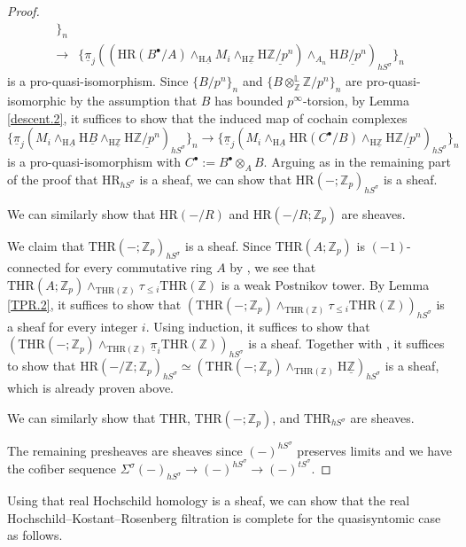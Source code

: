 \documentclass[10pt]{amsart}
\theoremstyle{definition}
\numberwithin{equation}{section}
\renewcommand{\L}{\mathbb{L}}
\newcommand{\Z}{\mathbb{Z}}
\newcommand{\rH}{\mathrm{H}}
\newcommand{\ul}{\underline}
\newcommand{\HR}{\mathrm{HR}}
\newcommand{\THR}{\mathrm{THR}}
\begin{document}
{\begin{proof}
\begin{align*}
\}_n
\\
\to &
\{
\ul{\pi}_j ((\HR(B^\bullet/A)\wedge_{\rH \ul{A}} M_i\wedge_{\rH \ul{\Z}}\rH \ul{\Z/p^n})\wedge_{A_n} \rH \ul{B/p^n})_{hS^\sigma}
\}_n
\end{align*}
is a pro-quasi-isomorphism.
Since $\{B/p^n\}_n$ and $\{B\otimes_{\Z}^\L\Z/p^n\}_n$ are pro-quasi-isomorphic by the assumption that $B$ has bounded $p^\infty$-torsion,
by Lemma \ref{descent.2},
it suffices to show that the induced map of cochain complexes
\[
\{
\ul{\pi}_j (M_i\wedge_{\rH \ul{A}}\rH \ul{B}\wedge_{\rH \ul{\Z}}\rH \ul{\Z/p^n})_{hS^\sigma}
\}_n
\to 
\{
\ul{\pi}_j (M_i\wedge_{\rH \ul{A}} \HR(C^\bullet/B)\wedge_{\rH \ul{\Z}}\rH \ul{\Z/p^n})_{hS^\sigma}
\}_n
\]
is a pro-quasi-isomorphism  with $C^\bullet:=B^\bullet\otimes_{A}B$.
Arguing as in the remaining part of the proof that $\HR_{hS^\sigma}$ is a sheaf,
we can show that $\HR(-;\Z_p)_{hS^\sigma}$ is a sheaf.

We can similarly show that $\HR(-/R)$ and $\HR(-/R;\Z_p)$ are sheaves.



We claim that $\THR(-;\Z_p)_{hS^\sigma}$ is a sheaf.
Since $\THR(A;\Z_p)$ is $(-1)$-connected for every commutative ring $A$ by \cite[Proposition 4.13]{HP},
we see that
$\THR(A;\Z_p)\wedge_{\THR(\Z)}\tau_{\leq i} \THR(\Z)$ is a weak Postnikov tower.
By Lemma \ref{TPR.2},
it suffices to show that $(\THR(-;\Z_p)\wedge_{\THR(\Z)}\tau_{\leq i}\THR(\Z))_{hS^\sigma}$ is a sheaf for every integer $i$.
Using induction,
it suffices to show that $(\THR(-;\Z_p)\wedge_{\THR(\Z)}\ul{\pi}_i\THR(\Z))_{hS^\sigma}$ is a sheaf.
Together with \cite[Lemma 4.14, Construction 4.16, Proposition 4.25]{HP},
it suffices to show that
$\HR(-/\Z;\Z_p)_{hS^\sigma}\simeq (\THR(-;\Z_p)\wedge_{\THR(\Z)}\rH \ul{\Z})_{hS^\sigma}$ is a sheaf,
which is already proven above.

We can similarly show that $\THR$, $\THR(-;\Z_p)$, and $\THR_{hS^\sigma}$ are sheaves.

The remaining presheaves are sheaves since $(-)^{hS^\sigma}$ preserves limits and we have the cofiber sequence $\Sigma^\sigma (-)_{hS^\sigma}\to (-)^{hS^\sigma}\to (-)^{tS^\sigma}$.
\end{proof}

Using that real Hochschild homology is a sheaf,
we can show that the real Hochschild--Kostant--Rosenberg filtration is complete for the quasisyntomic case as follows.


}
\end{document}
